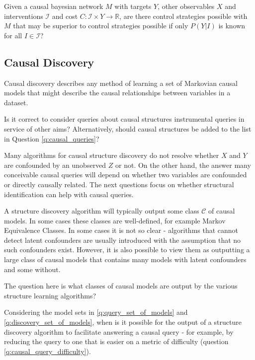 \begin{question}
    Given a causal bayesian network $M$ with targets $Y$, other observables $X$ and interventions $\mathcal{I}$ and cost $C:\mathcal{I}\times Y\to\mathbb{R}$, are there control strategies possible with $M$ that may be superior to control strategies possible if only $P(Y|I)$ is known for all $I\in\mathcal{I}$?
\end{question}

\subsection{Causal Discovery}

Causal discovery describes any method of learning a set of Markovian causal models that might describe the causal relationships between variables in a dataset.

\begin{question}
    Is it correct to consider queries about causal structures instrumental queries in service of other aims? Alternatively, should causal structures be added to the list in Question \ref{q:causal_queries}?
\end{question}

Many algorithms for causal structure discovery do not resolve whether $X$ and $Y$ are confounded by an unobserved $Z$ or not. On the other hand, the answer many conceivable causal queries will depend on whether two variables are confounded or directly causally related. The next questions focus on whether structural identification can help with causal queries.

\begin{question}\label{q:discovery_set_of_models}
    A structure discovery algorithm will typically output some class $\mathcal{C}$ of causal models. In some cases these classes are well-defined, for example Markov Equivalence Classes. In some cases it is not so clear - algorithms that cannot detect latent confounders are usually introduced with the assumption that no such confounders exist. However, it is also possible to view them as outputting a large class of causal models that contains many models with latent confounders and some without.
    
    The question here is what classes of causal models are output by the various structure learning algorithms?
\end{question}

\begin{question}
    Considering the model sets in \ref{q:query_set_of_models} and \ref{q:discovery_set_of_models}, when is it possible for the output of a structure discovery algorithm to facilitate answering a causal query - for example, by reducing the query to one that is easier on a metric of difficulty (question \ref{q:causal_query_difficulty}).
\end{question}

